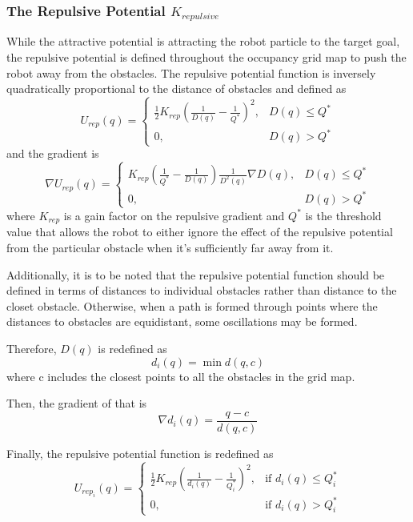\documentclass[11pt]{article} %
\begin{document}
\subsubsection{The Repulsive Potential $K_{repulsive}$}
While the attractive potential is attracting the robot particle to the target goal, the repulsive potential is defined throughout the occupancy grid map to push the robot away from the obstacles.  The repulsive potential function is inversely quadratically proportional to the distance of obstacles and defined as
\begin{equation}
	U_{rep}(q) = 
	\begin{cases}
		\frac{1}{2}K_{rep}(\frac{1}{D(q)}-\frac{1}{Q^*})^2, & D(q) \leq Q^{*} \\
		0, & D(q) > Q^{*}
	\end{cases}
\end{equation}
and the gradient is
\begin{equation}
	\nabla U_{rep}(q) = 
	\begin{cases}
		K_{rep}(\frac{1}{Q^*}-\frac{1}{D(q)})\frac{1}{D^2(q)}\nabla D(q), & D(q) \leq Q^{*} \\
		0, & D(q) > Q^{*}
	\end{cases}
\end{equation}
where $K_{rep}$ is a gain factor on the repulsive gradient and $Q^{*}$ is the threshold value that allows the robot to either ignore the effect of the repulsive potential from the particular obstacle when it's sufficiently far away from it.

Additionally, it is to be noted that the repulsive potential function should be defined in terms of distances to individual obstacles rather than distance to the closet obstacle.  Otherwise, when a path is formed through points where the distances to obstacles are equidistant, some oscillations may be formed.

Therefore, $D(q)$ is redefined as
\begin{equation}
	d_i(q) = \min d(q,c)
\end{equation}
where c includes the closest points to all the obstacles in the grid map.

Then, the gradient of that is
\begin{equation}
	\nabla d_i(q) = \frac{q-c}{d(q,c)}
\end{equation}

Finally, the repulsive potential function is redefined as
\begin{equation}
	U_{rep_{i}}(q) = 
	\begin{cases}
		\frac{1}{2}K_{rep}(\frac{1}{d_i(q)}-\frac{1}{Q_i^*})^2, & \mbox{if } d_i(q) \leq Q_i^* \\
		0 ,& \mbox{if } d_i(q) > Q_i^*
	\end{cases}
\end{equation}
\end{document}
